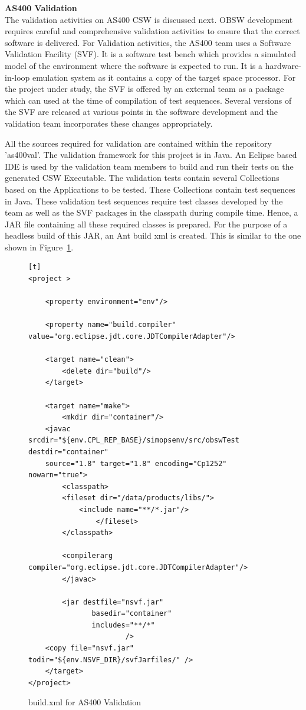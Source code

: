 \documentclass[12pt, a4paper, titlepage]{scrartcl}
\begin{document}
\par \textbf{AS400 Validation} \\
The validation activities on AS400 CSW is discussed next. OBSW development requires careful and comprehensive validation activities to ensure that the correct software is delivered. For Validation activities, the AS400 team uses a Software Validation Facility (SVF)\cite{hjortnaes1997software}. It is a software test bench which provides a simulated model of the environment where the software is expected to run. It is a hardware-in-loop emulation system as it contains a copy of the target space processor. For the project under study, the SVF is offered by an external team as a package which can used at the time of compilation of test sequences. Several versions of the SVF are released at various points in the software development and the validation team incorporates these changes appropriately. 
\par All the sources required for validation are contained within the repository 'as400val'. The validation framework for this project is in Java. An Eclipse based IDE is used by the validation team members to build and run their tests on the generated CSW Executable. The validation tests contain several Collections based on the Applications to be tested. These Collections contain test sequences in Java. These validation test sequences require test classes developed by the team as well as the SVF packages in the classpath during compile time. Hence, a JAR file containing all these required classes is prepared. For the purpose of a headless build of this JAR, an Ant build xml is created. This is similar to the one shown in Figure~\ref{fig:build-xml-validation}.

\begin{figure}[!ht]
\caption{build.xml for AS400 Validation}
\label{fig:build-xml-validation}
\begin{lstlisting}[frame=single][t]
<project >

    <property environment="env"/>
    
    <property name="build.compiler" value="org.eclipse.jdt.core.JDTCompilerAdapter"/>

    <target name="clean">
        <delete dir="build"/>
    </target>

    <target name="make">
        <mkdir dir="container"/>
	<javac srcdir="${env.CPL_REP_BASE}/simopsenv/src/obswTest destdir="container" 
	source="1.8" target="1.8" encoding="Cp1252" nowarn="true">
		<classpath>
		<fileset dir="/data/products/libs/">
			<include name="**/*.jar"/>
			    </fileset>
		</classpath>
	 
		<compilerarg compiler="org.eclipse.jdt.core.JDTCompilerAdapter"/>
	    </javac>

	    <jar destfile="nsvf.jar"
		       basedir="container"
		       includes="**/*"
				       />
	<copy file="nsvf.jar" todir="${env.NSVF_DIR}/svfJarfiles/" />
    </target>
</project>
\end{lstlisting}
\end{figure} 
\end{document}
